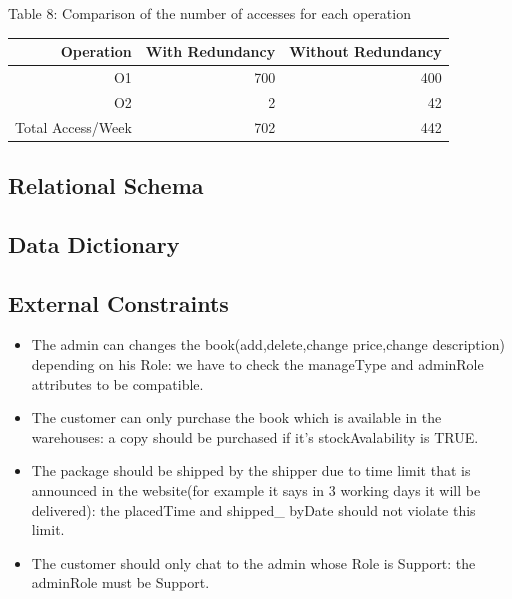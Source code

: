 Table 8: Comparison of the number of accesses for each operation 


\begin{center}
\begin{tabular}{|r|r|r|}
\hline
     Operation & With Redundancy & Without Redundancy\\\hline
    O1 & 700 & 400  \\\hline
    O2 & 2 & 42 \\\hline
    Total Access/Week & 702 & 442 \\\hline
\end{tabular}
\end{center}

\subsection{Relational Schema}


\subsection{Data Dictionary}



\subsection{External Constraints}
\begin{itemize}
        
        \item The admin can changes the book(add,delete,change price,change description) depending on his Role: we have to check the manageType and adminRole attributes to be compatible.
        \item The customer can only purchase the book which is available in the warehouses: a copy should be purchased if it's stockAvalability is TRUE.
        \item The package should be shipped by the shipper due to time limit that is announced in the website(for example it says in 3 working days it will be delivered): the placedTime and shipped\_ byDate should not violate this limit.
        \item The customer should only chat to the admin whose Role is Support: the adminRole must be Support.
    \end{itemize}